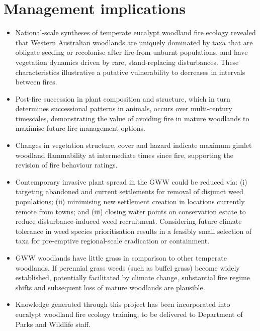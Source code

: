 \documentclass[version=last,
    paper=a4, %
    10pt, %
    usenames,
    dvipsnames,
    oneside, %
    headings=openany, %
    DIV=15 %
]{scrbook}
\begin{document}
\section*{Management implications}
\begin{itemize}
\itemsep1pt\parskip0pt
\item
  National-scale syntheses of temperate eucalypt woodland fire ecology
  revealed that Western Australian woodlands are uniquely dominated by
  taxa that are obligate seeding or recolonise after fire from unburnt
  populations, and have vegetation dynamics driven by rare,
  stand-replacing disturbances. These characteristics illustrative a
  putative vulnerability to decreases in intervals between fires.
\item
  Post-fire succession in plant composition and structure, which in turn
  determines successional patterns in animals, occurs over multi-century
  timescales, demonstrating the value of avoiding fire in mature
  woodlands to maximise future fire management options.
\item
  Changes in vegetation structure, cover and hazard indicate maximum
  gimlet woodland flammability at intermediate times since fire,
  supporting the revision of fire behaviour ratings.
\item
  Contemporary invasive plant spread in the GWW could be reduced via:
  (i) targeting abandoned and current settlements for removal of
  disjunct weed populations; (ii) minimising new settlement creation in
  locations currently remote from towns; and (iii) closing water points
  on conservation estate to reduce disturbance-induced weed recruitment.
  Considering future climate tolerance in weed species prioritisation
  results in a feasibly small selection of taxa for pre-emptive
  regional-scale eradication or containment.
\item
  GWW woodlands have little grass in comparison to other temperate
  woodlands. If perennial grass weeds (such as buffel grass) become
  widely established, potentially facilitated by climate change,
  substantial fire regime shifts and subsequent loss of mature woodlands
  are plausible.
\item
  Knowledge generated through this project has been incorporated into
  eucalypt woodland fire ecology training, to be delivered to Department
  of Parks and Wildlife staff.
\end{itemize}
\end{document}
